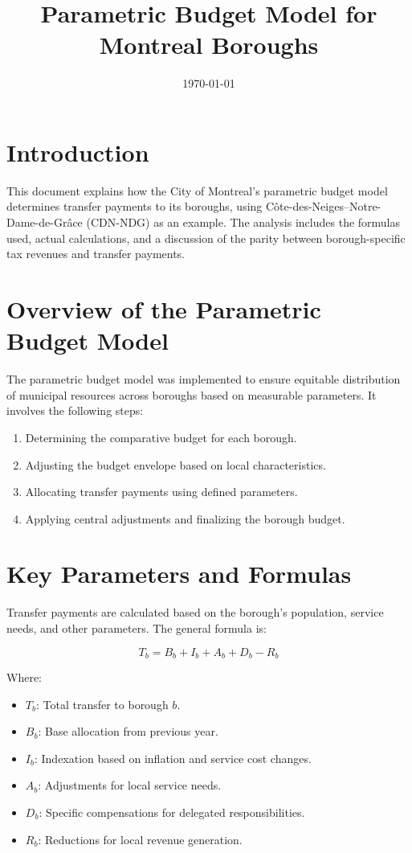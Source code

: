 \documentclass{article}
\title{Parametric Budget Model for Montreal Boroughs}
\author{}
\date{\today}
\begin{document}
\maketitle

\section{Introduction}
This document explains how the City of Montreal's parametric budget model determines transfer payments to its boroughs, using Côte-des-Neiges–Notre-Dame-de-Grâce (CDN-NDG) as an example. The analysis includes the formulas used, actual calculations, and a discussion of the parity between borough-specific tax revenues and transfer payments.

\section{Overview of the Parametric Budget Model}
The parametric budget model was implemented to ensure equitable distribution of municipal resources across boroughs based on measurable parameters. It involves the following steps:
\begin{enumerate}
    \item Determining the comparative budget for each borough.
    \item Adjusting the budget envelope based on local characteristics.
    \item Allocating transfer payments using defined parameters.
    \item Applying central adjustments and finalizing the borough budget.
\end{enumerate}

\section{Key Parameters and Formulas}
Transfer payments are calculated based on the borough's population, service needs, and other parameters. The general formula is:

\begin{equation}
T_b = B_b + I_b + A_b + D_b - R_b
\end{equation}

Where:
\begin{itemize}
    \item \( T_b \): Total transfer to borough \( b \).
    \item \( B_b \): Base allocation from previous year.
    \item \( I_b \): Indexation based on inflation and service cost changes.
    \item \( A_b \): Adjustments for local service needs.
    \item \( D_b \): Specific compensations for delegated responsibilities.
    \item \( R_b \): Reductions for local revenue generation.
\end{itemize}
\end{document}
